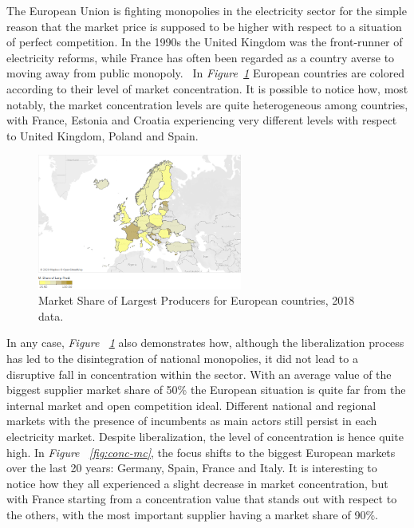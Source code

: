 \documentclass[a4paper,12pt]{book}
\begin{document}
The European Union is fighting monopolies in the electricity sector for the simple reason that the market price is supposed to be higher with respect to a situation of perfect competition. In the 1990s the United Kingdom was the front-runner of electricity reforms, while France has often been regarded as a country averse to moving away from public monopoly.~\cite{fiorio2009reform} In \textit{Figure~\ref{fig:conc}} European countries are colored according to their level of market concentration. It is possible to notice how, most notably, the market concentration levels are quite heterogeneous among countries, with France, Estonia and Croatia experiencing very different levels with respect to United Kingdom, Poland and Spain. 

\begin{figure}[tb]
\begin{center}
\captionsetup{justification=centering}
\includegraphics[width=0.6\textwidth]{Images/conc.png}
\caption{Market Share of Largest Producers for European countries, 2018 data. }
\label{fig:conc}
\end{center}
\end{figure}

In any case, \textit{Figure ~\ref{fig:conc}} also demonstrates how, although the liberalization process has led to the disintegration of national monopolies, it did not lead to a disruptive fall in concentration within the sector. With an average value of the biggest  supplier market share of 50\% the European situation is quite far from the internal market and open competition ideal. Different national and regional markets with the presence of incumbents as main actors still persist in each electricity market. Despite liberalization, the level of concentration is hence quite high.  In \textit{Figure ~\ref{fig:conc-mc}}, the focus shifts to the biggest European markets over the last 20 years: Germany, Spain, France and Italy. It is interesting to notice how they all experienced a slight decrease in market concentration, but with France starting from a concentration value that stands out with respect to the others, with the most important supplier having a market share of 90\%.
\end{document}
